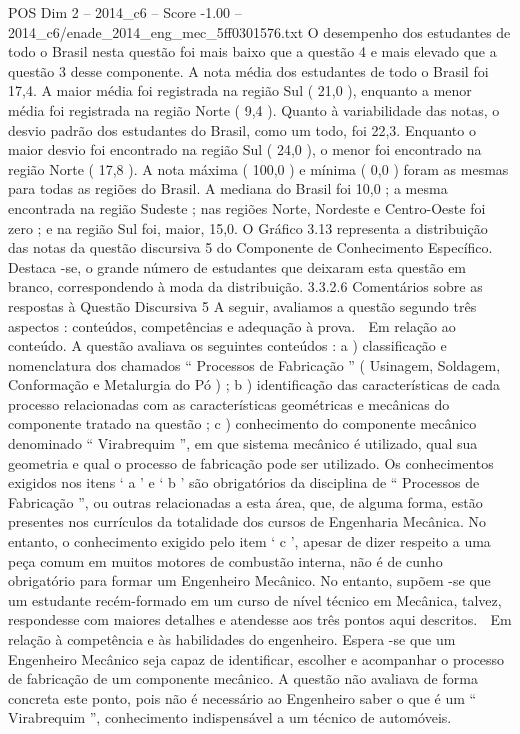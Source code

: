\begin{textsample}{POS Dim 2 – 2014\_c6 – Score -1.00 – 2014\_c6/enade\_2014\_eng\_mec\_5ff0301576.txt}
O desempenho dos estudantes de todo o Brasil nesta questão foi mais baixo que a questão 4 e mais elevado que a questão 3 desse componente.
A nota média dos estudantes de todo o Brasil foi 17,4.
A maior média foi registrada na região Sul ( 21,0 ), enquanto a menor média foi registrada na região Norte ( 9,4 ).
Quanto à variabilidade das notas, o desvio padrão dos estudantes do Brasil, como um todo, foi 22,3.
Enquanto o maior desvio foi encontrado na região Sul ( 24,0 ), o menor foi encontrado na região Norte ( 17,8 ).
A nota máxima ( 100,0 ) e mínima ( 0,0 ) foram as mesmas para todas as regiões do Brasil.
A mediana do Brasil foi 10,0 ; a mesma encontrada na região Sudeste ; nas regiões Norte, Nordeste e Centro-Oeste foi zero ; e na região Sul foi, maior, 15,0.
O Gráfico 3.13 representa a distribuição das notas da questão discursiva 5 do Componente de Conhecimento Específico.
Destaca -se, o grande número de estudantes que deixaram esta questão em branco, correspondendo à moda da distribuição. 3.3.2.6 Comentários sobre as respostas à Questão Discursiva 5 A seguir, avaliamos a questão segundo três aspectos : conteúdos, competências e adequação à prova.  Em relação ao conteúdo.
A questão avaliava os seguintes conteúdos : a ) classificação e nomenclatura dos chamados “ Processos de Fabricação ” ( Usinagem, Soldagem, Conformação e Metalurgia do Pó ) ; b ) identificação das características de cada processo relacionadas com as características geométricas e mecânicas do componente tratado na questão ; c ) conhecimento do componente mecânico denominado “ Virabrequim ”, em que sistema mecânico é utilizado, qual sua geometria e qual o processo de fabricação pode ser utilizado.
Os conhecimentos exigidos nos itens ‘ a ’ e ‘ b ’ são obrigatórios da disciplina de “ Processos de Fabricação ”, ou outras relacionadas a esta área, que, de alguma forma, estão presentes nos currículos da totalidade dos cursos de Engenharia Mecânica.
No entanto, o conhecimento exigido pelo item ‘ c ’, apesar de dizer respeito a uma peça comum em muitos motores de combustão interna, não é de cunho obrigatório para formar um Engenheiro Mecânico.
No entanto, supõem -se que um estudante recém-formado em um curso de nível técnico em Mecânica, talvez, respondesse com maiores detalhes e atendesse aos três pontos aqui descritos.  Em relação à competência e às habilidades do engenheiro.
Espera -se que um Engenheiro Mecânico seja capaz de identificar, escolher e acompanhar o processo de fabricação de um componente mecânico.
A questão não avaliava de forma concreta este ponto, pois não é necessário ao Engenheiro saber o que é um “ Virabrequim ”, conhecimento indispensável a um técnico de automóveis.

\end{textsample}
